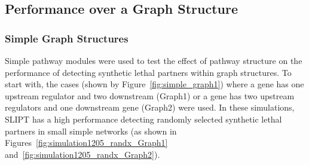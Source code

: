 \FloatBarrier

\subsection{Performance over a Graph Structure}
\label{chapt5:graphsim_performance}

\subsubsection{Simple Graph Structures}
\label{chapt5:graphsim_performance_simple}

\FloatBarrier

Simple pathway modules were used to test the effect of pathway structure on the performance of detecting synthetic lethal partners within graph structures. To start with, the cases (shown by Figure~\ref{fig:simple_graph1}) where a gene has one upstream regulator and two downstream (Graph1) or a gene has two upstream regulators and one downstream gene (Graph2) were used. In these simulations, \gls{SLIPT} has a high performance detecting randomly selected synthetic lethal partners in small simple networks (as shown in Figures~\ref{fig:simulation1205_randx_Graph1} and~\ref{fig:simulation1205_randx_Graph2}). 

